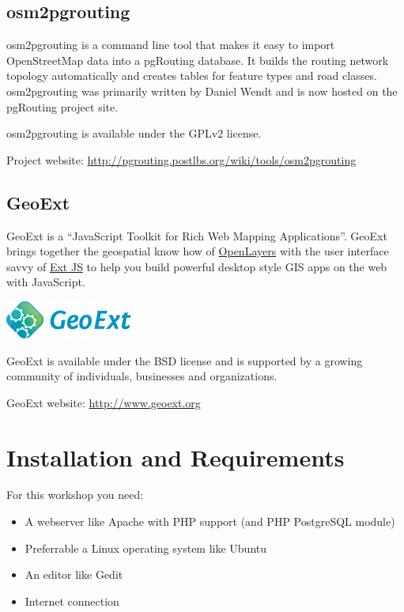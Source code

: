 \documentclass[a4paper,10pt,english]{manual}
\begin{document}
\section{osm2pgrouting}

osm2pgrouting is a command line tool that makes it easy to import OpenStreetMap data into a pgRouting database. It builds the routing network topology automatically and creates tables for feature types and road classes. osm2pgrouting was primarily written by Daniel Wendt and is now hosted on the pgRouting project site.

osm2pgrouting is available under the GPLv2 license.

Project website: \href{http://pgrouting.postlbs.org/wiki/tools/osm2pgrouting}{http://pgrouting.postlbs.org/wiki/tools/osm2pgrouting}


\section{GeoExt}

GeoExt is a ``JavaScript Toolkit for Rich Web Mapping Applications''. GeoExt brings together the geospatial know how of \href{http://www.openlayers.org}{OpenLayers} with the user interface savvy of \href{http://www.sencha.com}{Ext JS} to help you build powerful desktop style GIS apps on the web with JavaScript.

\includegraphics{GeoExt.png}

GeoExt is available under the BSD license and is supported by a growing community of individuals, businesses and organizations.

GeoExt website: \href{http://www.geoext.org}{http://www.geoext.org}

\resetcurrentobjects
\hypertarget{--doc-chapters/installation}{}

\chapter{Installation and Requirements}

For this workshop you need:
\begin{itemize}
\item {} 
A webserver like Apache with PHP support (and PHP PostgreSQL module)

\item {} 
Preferrable a Linux operating system like Ubuntu

\item {} 
An editor like Gedit

\item {} 
Internet connection

\end{itemize}
\end{document}
